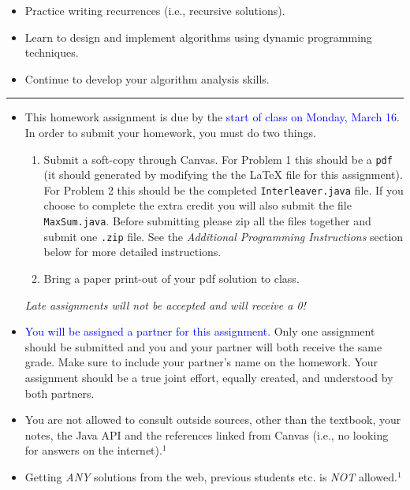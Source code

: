 \documentclass[11pt,answers]{exam}
\begin{document}

 \begin{itemize}
\item Practice writing recurrences (i.e., recursive solutions).
 \item Learn to design and implement algorithms using dynamic programming techniques.
\item Continue to develop your algorithm analysis skills.
 \end{itemize}

\hrule
\vspace{2em}

\begin{itemize}
\item This homework assignment is due by the \textcolor{blue}{start of class on Monday, March 16}. In order to submit your homework, you must do two things.
\begin{enumerate}
\item Submit a soft-copy through Canvas.  For Problem 1 this should be a  \texttt{pdf}  (it should generated by modifying the the LaTeX file for this assignment).  For Problem 2 this should be the completed \texttt{Interleaver.java} file.  If you choose to complete the extra credit you will also submit the file \texttt{MaxSum.java}. Before submitting please zip all the files together and submit one \texttt{.zip} file.  See the \emph{Additional Programming Instructions} section below for more detailed instructions.
\item Bring a paper print-out of your pdf solution to class.
\end{enumerate}
\emph{Late assignments will not be accepted and will receive a 0!}
\item \textcolor{blue}{You will be assigned a partner for this assignment.}  Only one assignment should be submitted and you and your partner will both receive the same grade.   Make sure to include your partner's name on the homework.  Your assignment should be a true joint effort, equally created, and understood by both partners. 
\item You are not allowed to consult outside sources, other than the textbook, your notes, the Java API and the references linked from Canvas (i.e., no looking for answers on the internet).$^1$
\item Getting \emph{ANY} solutions from the web, previous students etc. is \emph{NOT} allowed.$^1$ 

\end{itemize}
\end{document}
